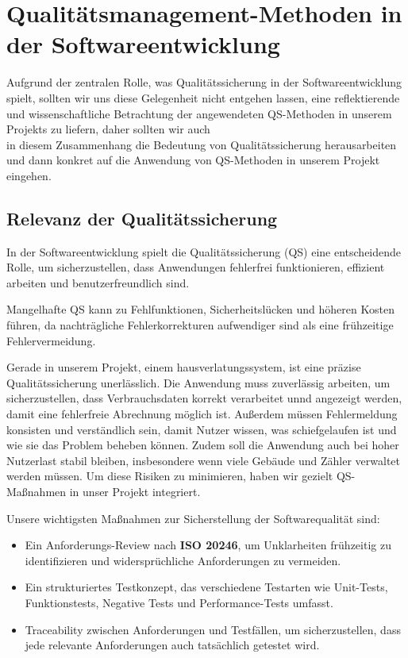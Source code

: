 \section{Qualitätsmanagement-Methoden in der Softwareentwicklung}\label{Qualitätsmanagement-Methoden in der Softwareentwicklung}

Aufgrund  der zentralen Rolle, was Qualitätssicherung in der Softwareentwicklung spielt, sollten wir uns diese Gelegenheit nicht entgehen lassen, eine reflektierende und wissenschaftliche Betrachtung der angewendeten QS-Methoden in unserem Projekts zu liefern, daher sollten wir auch\\
in diesem Zusammenhang die Bedeutung von Qualitätssicherung herausarbeiten und dann konkret auf die Anwendung von QS-Methoden in unserem Projekt eingehen.\par

\subsection{Relevanz der Qualitätssicherung}

In der Softwareentwicklung spielt die Qualitätssicherung (QS) eine entscheidende Rolle, um sicherzustellen, dass Anwendungen fehlerfrei funktionieren, effizient arbeiten und benutzerfreundlich sind.\par

Mangelhafte QS kann zu Fehlfunktionen, Sicherheitslücken und höheren Kosten führen, da nachträgliche Fehlerkorrekturen aufwendiger sind als eine frühzeitige Fehlervermeidung.\par

Gerade in unserem Projekt, einem hausverlatungssystem, ist eine präzise Qualitätssicherung unerlässlich. Die Anwendung muss zuverlässig arbeiten, um sicherzustellen, dass Verbrauchsdaten korrekt verarbeitet unnd angezeigt werden,\\
damit eine fehlerfreie Abrechnung möglich ist. Außerdem müssen Fehlermeldung konsisten und verständlich sein, damit Nutzer wissen, was schiefgelaufen ist und wie sie das Problem beheben können.
Zudem soll die Anwendung auch bei hoher Nutzerlast stabil bleiben, insbesondere wenn viele Gebäude und Zähler verwaltet werden müssen.
Um diese Risiken zu minimieren, haben wir gezielt QS-Maßnahmen in unser Projekt integriert.\par

Unsere wichtigsten Maßnahmen zur Sicherstellung der Softwarequalität sind:

\begin{itemize}
    \item Ein Anforderungs-Review nach \textbf{ISO 20246}, um Unklarheiten frühzeitig zu identifizieren und widersprüchliche Anforderungen zu vermeiden.
    \item Ein strukturiertes Testkonzept, das verschiedene Testarten wie Unit-Tests, Funktionstests, Negative Tests und Performance-Tests umfasst.
    \item Traceability zwischen Anforderungen und Testfällen, um sicherzustellen, dass jede relevante Anforderungen auch tatsächlich getestet wird.
\end{itemize}


